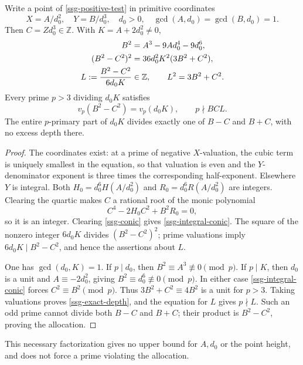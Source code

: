 \begin{theorem}\label{ssg-integral}
Write a point of \eqref{ssg-positive-test} in primitive coordinates
\[
 X=A/d_0^2,\quad Y=B/d_0^3,\quad d_0>0,\quad
 \gcd(A,d_0)=\gcd(B,d_0)=1.
\]
Then \(C=Zd_0^3\in\mathbb Z\). With \(K=A+2d_0^2\ne0\),
\begin{align}
 B^2&=A^3-9Ad_0^4-9d_0^6,\notag\\
 (B^2-C^2)^2&=36d_0^2K^2(3B^2+C^2),\label{ssg-integral-conic}\\
 L:=\frac{B^2-C^2}{6d_0K}&\in\mathbb Z,\qquad
 L^2=3B^2+C^2.\notag
\end{align}
Every prime \(p>3\) dividing \(d_0K\) satisfies
\begin{equation}\label{ssg-exact-depth}
 v_p(B^2-C^2)=v_p(d_0K),\qquad p\nmid BCL.
\end{equation}
The entire \(p\)-primary part of \(d_0K\) divides exactly one of
\(B-C\) and \(B+C\), with no excess depth there.
\end{theorem}
\begin{proof}
The coordinates exist: at a prime of negative \(X\)-valuation,
the cubic term is uniquely smallest in the equation, so that
valuation is even and the \(Y\)-denominator exponent is three
times the corresponding half-exponent. Elsewhere \(Y\) is integral.
Both \(H_0=d_0^6H(A/d_0^2)\) and \(R_0=d_0^6R(A/d_0^2)\) are integers.
Clearing the quartic makes \(C\) a rational root of the monic polynomial
\[
 C^4-2H_0C^2+B^2R_0=0,
\]
so it is an integer. Clearing \eqref{ssg-conic} gives
\eqref{ssg-integral-conic}. The square of the nonzero integer \(6d_0K\)
divides \((B^2-C^2)^2\); prime valuations imply
\(6d_0K\mid B^2-C^2\), and hence the assertions about \(L\).

One has \(\gcd(d_0,K)=1\). If \(p\mid d_0\), then
\(B^2\equiv A^3\not\equiv0\pmod p\).
If \(p\mid K\), then \(d_0\) is a unit and
\(A\equiv-2d_0^2\), giving \(B^2\equiv d_0^6\not\equiv0\pmod p\).
In either case \eqref{ssg-integral-conic} forces
\(C^2\equiv B^2\pmod p\). Thus \(3B^2+C^2\equiv4B^2\) is a unit
for \(p>3\). Taking valuations proves \eqref{ssg-exact-depth},
and the equation for \(L\) gives \(p\nmid L\).
Such an odd prime cannot divide both \(B-C\) and \(B+C\);
their product is \(B^2-C^2\), proving the allocation.
\end{proof}
This necessary factorization gives no upper bound for \(A,d_0\)
or the point height, and does not force a prime violating the allocation.

